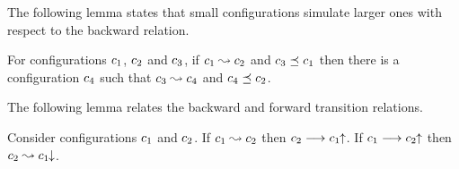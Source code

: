 The following lemma states that small configurations simulate larger ones
with respect to the backward relation.

\begin{lemma}
\label{pre:js:monotonic:lemma}
For configurations $c_1$, $c_2$ and $c_3$, if
$c_1\stackrel{}{\leadsto}c_2$ and $c_3\preceq c_1$ then there
is a configuration $c_4$ such that $c_3\stackrel{}{\leadsto}c_4$ and
$c_4\preceq c_2$.
\end{lemma}

The following lemma relates the backward and forward transition
relations.

\begin{lemma}
\label{backwards:iff:forwards:lemma}
Consider configurations $c_1$ and $c_2$.
%
If $c_1\stackrel{}{\leadsto}c_2$ then $c_2\stackrel{}{\longrightarrow}c_1\!\!\uparrow$.
%
If $c_1\stackrel{}{\longrightarrow}c_2\!\!\uparrow$
then $c_2\stackrel{}{\leadsto}c_1\!\!\downarrow$.
\end{lemma}
%
%
